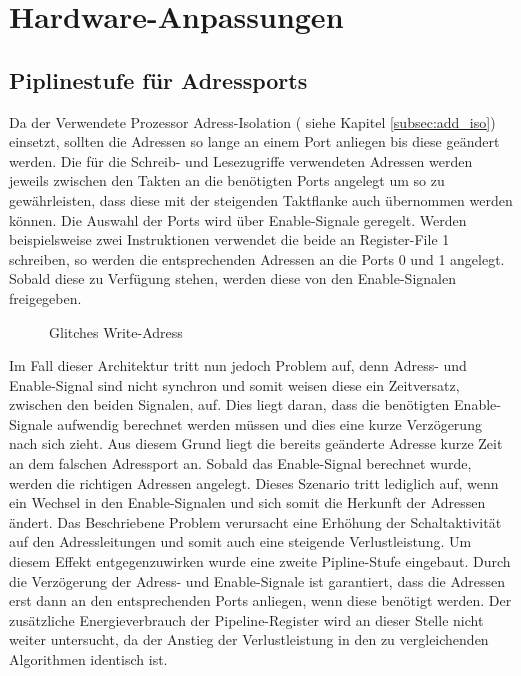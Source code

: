 \chapter{Hardware-Anpassungen}

\section{Piplinestufe für Adressports}
Da der Verwendete Prozessor Adress-Isolation ( siehe Kapitel \ref{subsec:add_iso}) einsetzt, sollten die Adressen so lange an einem Port anliegen bis diese geändert werden.
Die für die Schreib- und Lesezugriffe verwendeten Adressen werden jeweils zwischen den Takten an die benötigten Ports angelegt um so zu gewährleisten, dass diese mit der steigenden Taktflanke auch übernommen werden können. Die Auswahl der Ports wird über Enable-Signale geregelt. Werden beispielsweise zwei Instruktionen verwendet die beide an Register-File 1 schreiben, so werden die entsprechenden Adressen an die Ports 0 und 1 angelegt. Sobald diese zu Verfügung stehen, werden diese von den Enable-Signalen freigegeben.\\

\begin{figure}[H] 
	\centering
	
	\caption{Glitches Write-Adress}
	\label{fig:glitches}
\end{figure}

Im Fall dieser Architektur tritt nun jedoch Problem auf, denn Adress- und Enable-Signal sind nicht synchron und somit weisen diese ein Zeitversatz, zwischen den beiden Signalen, auf. Dies liegt daran, dass die benötigten Enable-Signale aufwendig berechnet werden müssen und dies eine kurze Verzögerung nach sich zieht. Aus diesem Grund liegt die bereits geänderte Adresse kurze Zeit an dem falschen Adressport an. Sobald das Enable-Signal berechnet wurde, werden die richtigen Adressen angelegt. Dieses Szenario tritt lediglich auf, wenn ein Wechsel in den Enable-Signalen und sich somit die Herkunft der Adressen ändert. Das Beschriebene Problem verursacht eine Erhöhung der Schaltaktivität auf den Adressleitungen und somit auch eine steigende Verlustleistung. %
Um diesem Effekt entgegenzuwirken wurde eine zweite Pipline-Stufe eingebaut. Durch die Verzögerung der Adress- und Enable-Signale ist garantiert, dass die Adressen erst dann an den entsprechenden Ports anliegen, wenn diese benötigt werden. Der zusätzliche Energieverbrauch der Pipeline-Register wird an dieser Stelle nicht weiter untersucht, da der Anstieg der Verlustleistung in den zu vergleichenden Algorithmen identisch ist.

